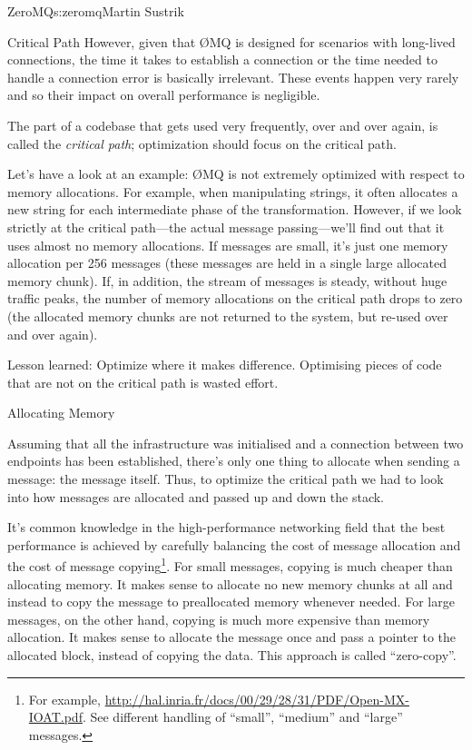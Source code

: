 \begin{aosachapter}{ZeroMQ}{s:zeromq}{Martin Sustrik}
\begin{aosasect1}{Critical Path}
However, given that {\O}MQ is designed for scenarios with long-lived
connections, the time it takes to establish a connection or the time
needed to handle a connection error is basically irrelevant. These
events happen very rarely and so their impact on overall performance
is negligible.

The part of a codebase that gets used very frequently, over and over
again, is called the \emph{critical path}; optimization should focus on
the critical path.

Let's have a look at an example: {\O}MQ is not extremely optimized with
respect to memory allocations. For example, when manipulating strings,
it often allocates a new string for each intermediate phase of the
transformation. However, if we look strictly at the critical path---the
actual message passing---we'll find out that it uses almost no memory
allocations. If messages are small, it's just one memory allocation
per 256 messages (these messages are held in a single large allocated
memory chunk). If, in addition, the stream of messages is steady,
without huge traffic peaks, the number of memory allocations on the
critical path drops to zero (the allocated memory chunks are not
returned to the system, but re-used over and over again).

Lesson learned: Optimize where it makes difference. Optimising pieces
of code that are not on the critical path is wasted effort.

\end{aosasect1}

\begin{aosasect1}{Allocating Memory}

Assuming that all the infrastructure was initialised and a connection
between two endpoints has been established, there's only one thing
to allocate when sending a message: the message itself. Thus, to
optimize the critical path we had to look into how messages are
allocated and passed up and down the stack.

It's common knowledge in the high-performance networking field that the best
performance is achieved by carefully balancing the cost of message
allocation and the cost of message copying\footnote{For example,
  \url{http://hal.inria.fr/docs/00/29/28/31/PDF/Open-MX-IOAT.pdf}.
  See different handling of ``small'', ``medium'' and ``large''
  messages.}. For small messages, copying is much cheaper than
allocating memory. It makes sense to allocate no new memory chunks at
all and instead to copy the message to preallocated memory whenever
needed. For large messages, on the other hand, copying is much more
expensive than memory allocation. It makes sense to allocate the
message once and pass a pointer to the allocated block, instead of
copying the data. This approach is called ``zero-copy''.


\end{aosasect1}
\end{aosachapter}
